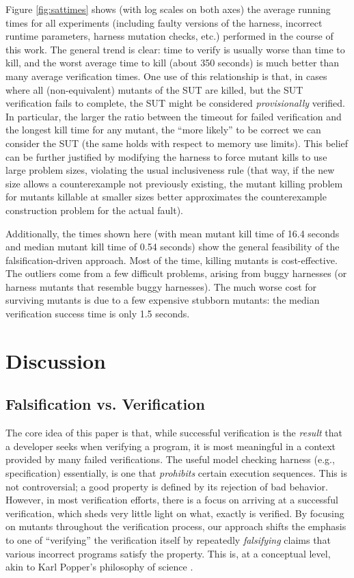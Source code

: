 \documentclass[conference]{IEEEtran}
\begin{document}
Figure \ref{fig:sattimes} shows (with log scales on both axes) the
average running times for all experiments (including faulty versions
of the harness, incorrect runtime parameters, harness mutation checks,
etc.) performed in the course of this work.  The general trend is
clear: time to verify is usually worse than time to kill, and the
worst average time to kill (about 350 seconds) is much better than
many average verification times.  One use of this relationship is
that, in cases where all (non-equivalent) mutants of the SUT are
killed, but the SUT verification fails to complete, the SUT might be
considered \emph{provisionally} verified. In particular, the larger
the ratio between the timeout for failed verification and the longest
kill time for any mutant, the ``more likely'' to be correct we can
consider the SUT (the same holds with respect to memory use
limits). This belief can be further justified by modifying the harness
to force mutant kills to use large problem sizes, violating the usual
inclusiveness rule (that way, if the new size allows a counterexample
not previously existing, the mutant killing problem for mutants
killable at smaller sizes better approximates the counterexample
construction problem for the actual fault).

Additionally, the times shown here (with mean mutant kill time of 16.4
seconds and median mutant kill time of 0.54 seconds) show the general
feasibility of the falsification-driven approach.  Most of the time,
killing mutants is cost-effective.  The outliers come from a few
difficult problems, arising from buggy harnesses (or harness mutants
that resemble buggy harnesses).  The much worse cost for surviving
mutants is due to a few expensive stubborn mutants: the median
verification success time is only 1.5 seconds.

\section{Discussion}

\subsection{Falsification vs. Verification}

The core idea of this paper is that, while successful verification is
the \emph{result} that a developer seeks when verifying a program, it
is most meaningful in a context provided by many failed verifications.
The useful model checking harness (e.g., specification) essentially,
is one that \emph{prohibits} certain execution sequences.  This is not
controversial; a good property is defined by its rejection of bad
behavior.  However, in most verification efforts, there is a focus on
arriving at a successful verification, which sheds very little light
on what, exactly is verified.  By focusing on mutants throughout the
verification process, our approach shifts the emphasis to one of
``verifying'' the verification itself by repeatedly \emph{falsifying}
claims that various incorrect programs satisfy the property.  This is,
at a conceptual level, akin to Karl Popper's philosophy of science
\cite{Popper}.
\end{document}

